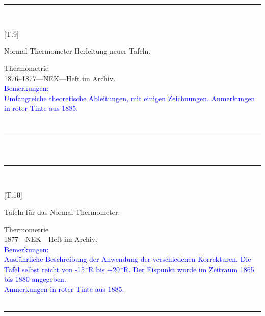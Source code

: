 \\
\vspace*{-2.5pt}\\
\parbox{\textwidth}{%
\rule{\textwidth}{1pt}\vspace*{-3mm}\\
\begin{minipage}[t]{0.2\textwidth}\vspace{0pt}
\Huge\rule[-4mm]{0cm}{1cm}[T.9]
\end{minipage}
\hfill
\begin{minipage}[t]{0.8\textwidth}\vspace{0pt}
\large Normal-Thermometer Herleitung neuer Tafeln.\rule[-2mm]{0mm}{2mm}
\end{minipage}
{\footnotesize\flushright
Thermometrie\\
}
1876--1877\quad---\quad NEK\quad---\quad Heft im Archiv.\\
\textcolor{blue}{Bemerkungen:\\{}
Umfangreiche theoretische Ableitungen, mit einigen Zeichnungen. Anmerkungen in roter Tinte aus 1885.\\{}
}
\\[-15pt]
\rule{\textwidth}{1pt}
}
\\
\vspace*{-2.5pt}\\
\parbox{\textwidth}{%
\rule{\textwidth}{1pt}\vspace*{-3mm}\\
\begin{minipage}[t]{0.22\textwidth}\vspace{0pt}
\Huge\rule[-4mm]{0cm}{1cm}[T.10]
\end{minipage}
\hfill
\begin{minipage}[t]{0.78\textwidth}\vspace{0pt}
\large Tafeln für das Normal-Thermometer.\rule[-2mm]{0mm}{2mm}
\end{minipage}
{\footnotesize\flushright
Thermometrie\\
}
1877\quad---\quad NEK\quad---\quad Heft im Archiv.\\
\textcolor{blue}{Bemerkungen:\\{}
Ausführliche Beschreibung der Anwendung der verschiedenen Korrekturen. Die Tafel selbst reicht von -15\,{$^\circ$}R bis +20\,{$^\circ$}R. Der Eispunkt wurde im Zeitraum 1865 bis 1880 angegeben.\\{}
Anmerkungen in roter Tinte aus 1885.\\{}
}
\\[-15pt]
\rule{\textwidth}{1pt}
}
